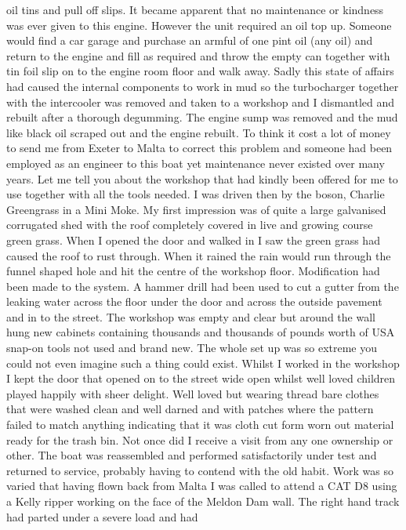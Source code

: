oil tins and pull off slips. It became apparent that no maintenance or kindness
was ever given to this engine. However the unit required an oil top up. Someone
would find a car garage and purchase an armful of one pint oil (any oil) and
return to the engine and fill as required and throw the empty can together with
tin foil slip on to the engine room floor and walk away. Sadly this state of
affairs had caused the internal components to work in mud so the turbocharger
together with the intercooler was removed and taken to a workshop and I
dismantled and rebuilt after a thorough degumming. The engine sump was removed
and the mud like black oil scraped out and the engine rebuilt. To think it cost
a lot of money to send me from Exeter to Malta to correct this problem and
someone had been employed as an engineer to this boat yet maintenance never
existed over many years. Let me tell you about the workshop that had kindly
been offered for me to use together with all the tools needed. I was driven
then by the boson, Charlie Greengrass in a Mini Moke. My first impression was
of quite a large galvanised corrugated shed with the roof completely covered in
live and growing course green grass. When I opened the door and walked in I saw
the green grass had caused the roof to rust through. When it rained the rain
would run through the funnel shaped hole and hit the centre of the workshop
floor. Modification had been made to the system. A hammer drill had been used
to cut a gutter from the leaking water across the floor under the door and
across the outside pavement and in to the street. The workshop was empty and
clear but around the wall hung new cabinets containing thousands and thousands
of pounds worth of USA snap-on tools not used and brand new. The whole set up
was so extreme you could not even imagine such a thing could exist. Whilst I
worked in the workshop I kept the door that opened on to the street wide open
whilst well loved children played happily with sheer delight. Well loved but
wearing thread bare clothes that were washed clean and well darned and with
patches where the pattern failed to match anything indicating that it was cloth
cut form worn out material ready for the trash bin. Not once did I receive a
visit from any one ownership or other. The boat was reassembled and performed
satisfactorily under test and returned to service, probably having to contend
with the old habit. Work was so varied that having flown back from Malta I was
called to attend a CAT D8 using a Kelly ripper working on the face of the
Meldon Dam wall. The right hand track had parted under a severe load and had
